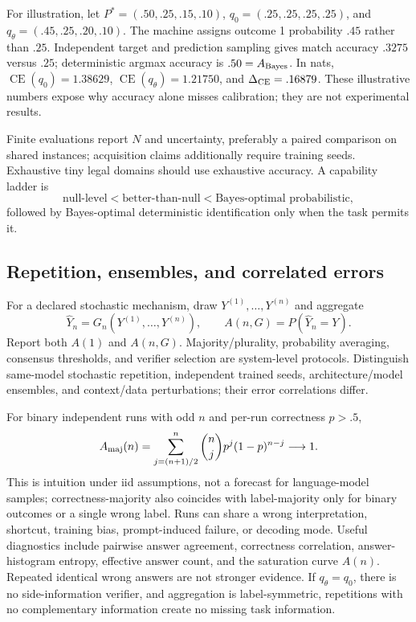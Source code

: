 \documentclass[10pt]{article}
\begin{document}
For illustration, let $P^*=(.50,.25,.15,.10)$, $q_0=(.25,.25,.25,.25)$, and $q_\theta=(.45,.25,.20,.10)$. The machine assigns outcome 1 probability $.45$ rather than $.25$. Independent target and prediction sampling gives match accuracy $.3275$ versus $.25$; deterministic argmax accuracy is $.50=A_{\rm Bayes}$. In nats, $\operatorname{CE}(q_0)=1.38629$, $\operatorname{CE}(q_\theta)=1.21750$, and $\Delta_{\rm CE}=.16879$. These illustrative numbers expose why accuracy alone misses calibration; they are not experimental results.

Finite evaluations report $N$ and uncertainty, preferably a paired comparison on shared instances; acquisition claims additionally require training seeds. Exhaustive tiny legal domains should use exhaustive accuracy. A capability ladder is
\[
\text{null-level}<\text{better-than-null}<\text{Bayes-optimal probabilistic},
\]
followed by Bayes-optimal deterministic identification only when the task permits it.

\subsection{Repetition, ensembles, and correlated errors}
For a declared stochastic mechanism, draw $Y^{(1)},\ldots,Y^{(n)}$ and aggregate
\[
\widehat Y_n=G_n(Y^{(1)},\ldots,Y^{(n)}),\qquad A(n,G)=P(\widehat Y_n=Y).
\]
Report both $A(1)$ and $A(n,G)$. Majority/plurality, probability averaging, consensus thresholds, and verifier selection are system-level protocols. Distinguish same-model stochastic repetition, independent trained seeds, architecture/model ensembles, and context/data perturbations; their error correlations differ.

For binary independent runs with odd $n$ and per-run correctness $p>.5$,
\[
A_{\rm maj}(n)=\sum_{j=(n+1)/2}^{n}\binom{n}{j}p^j(1-p)^{n-j}\longrightarrow1.
\]
This is intuition under iid assumptions, not a forecast for language-model samples; correctness-majority also coincides with label-majority only for binary outcomes or a single wrong label. Runs can share a wrong interpretation, shortcut, training bias, prompt-induced failure, or decoding mode. Useful diagnostics include pairwise answer agreement, correctness correlation, answer-histogram entropy, effective answer count, and the saturation curve $A(n)$. Repeated identical wrong answers are not stronger evidence. If $q_\theta=q_0$, there is no side-information verifier, and aggregation is label-symmetric, repetitions with no complementary information create no missing task information.
\end{document}
